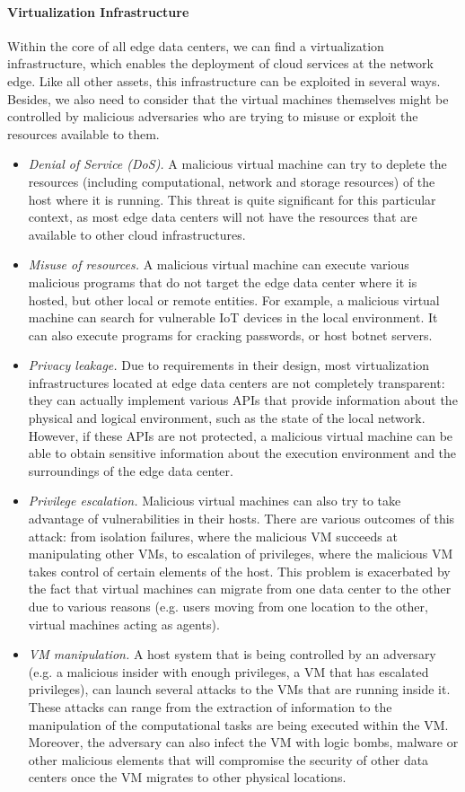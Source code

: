 \documentclass[twocolumn,preprint,3p]{elsarticle}
\begin{document}
\paragraph{Virtualization Infrastructure} Within the core of all edge data centers, we can find a virtualization infrastructure, which enables the deployment of cloud services at the network edge. Like all other assets, this infrastructure can be exploited in several ways. Besides, we also need to consider that the virtual machines themselves might be controlled by malicious adversaries who are trying to misuse or exploit the resources available to them.
    \begin{itemize}
      \item \textit{Denial of Service (DoS).} A malicious virtual machine can try to deplete the resources (including computational, network and storage resources) of the host where it is running. This threat is quite significant for this particular context, as most edge data centers will not have the resources that are available to other cloud infrastructures.
      \item \textit{Misuse of resources.} A malicious virtual machine can execute various malicious programs that do not target the edge data center where it is hosted, but other local or remote entities. For example, a malicious virtual machine can search for vulnerable IoT devices in the local environment. It can also execute programs for cracking passwords, or host botnet servers.
      \item \textit{Privacy leakage.} Due to requirements in their design, most virtualization infrastructures located at edge data centers are not completely transparent: they can actually implement various APIs that provide information about the physical and logical environment, such as the state of the local network. However, if these APIs are not protected, a malicious virtual machine can be able to obtain sensitive information about the execution environment and the surroundings of the edge data center.
      \item \textit{Privilege escalation.} Malicious virtual machines can also try to take advantage of vulnerabilities in their hosts. There are various outcomes of this attack: from isolation failures, where the malicious VM succeeds at manipulating other VMs, to escalation of privileges, where the malicious VM takes control of certain elements of the host. This problem is exacerbated by the fact that virtual machines can migrate from one data center to the other due to various reasons (e.g. users moving from one location to the other, virtual machines acting as agents).
      \item \textit{VM manipulation.} A host system that is being controlled by an adversary (e.g. a malicious insider with enough privileges, a VM that has escalated privileges), can launch several attacks to the VMs that are running inside it. These attacks can range from the extraction of information to the manipulation of the computational tasks are being executed within the VM. Moreover, the adversary can also infect the VM with logic bombs, malware or other malicious elements that will compromise the security of other data centers once the VM migrates to other physical locations.
    \end{itemize}
\end{document}

